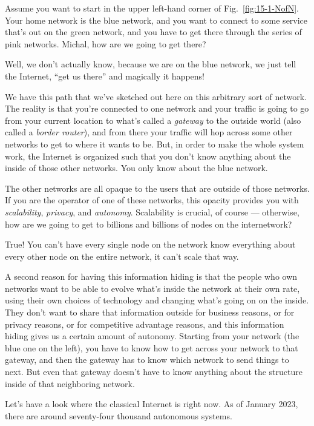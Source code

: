 Assume you want to start in the upper left-hand corner of Fig.~\ref{fig:15-1-NofN}. Your home network is the blue network, and you want to connect to some service that's out on the green network, and you have to get there through the series of pink networks. Michal, how are we going to get there?

\mmm Well, we don't actually know, because we are on the blue network, we just tell the Internet, ``get us there'' and magically it happens!

\rrr We have this path that we've sketched out here on this arbitrary sort of network. The reality is that you're connected to one network and your traffic is going to go from your current location to what's called a \emph{gateway} to the outside world (also called a \emph{border router}), and from there your traffic will hop across some other networks to get to where it wants to be. But, in order to make the whole system work, the Internet is organized such that you don't know anything about the inside of those other networks. You only know about the blue network.

The other networks are all opaque to the users that are outside of those networks. If you are the operator of one of these networks, this opacity provides you with \emph{scalability}, \emph{privacy}, and \emph{autonomy}. Scalability is crucial, of course --- otherwise, how are we going to get to billions and billions of nodes on the internetwork?

\mmm True! You can't have every single node on the network know everything about every other node on the entire network, it can't scale that way.

\rrr A second reason for having this information hiding is that the people who own networks want to be able to evolve what's inside the network at their own rate, using their own choices of technology and changing what's going on on the inside. They don't want to share that information outside for business reasons, or for privacy reasons, or for competitive advantage reasons, and this information hiding gives us a certain amount of autonomy. Starting from your network (the blue one on the left), you have to know how to get across your network to that gateway, and then the gateway has to know which network to send things to next. But even that gateway doesn't have to know anything about the structure inside of that neighboring network.

\mmm Let's have a look where the classical Internet is right now. As of January 2023, there are around seventy-four thousand autonomous systems.

